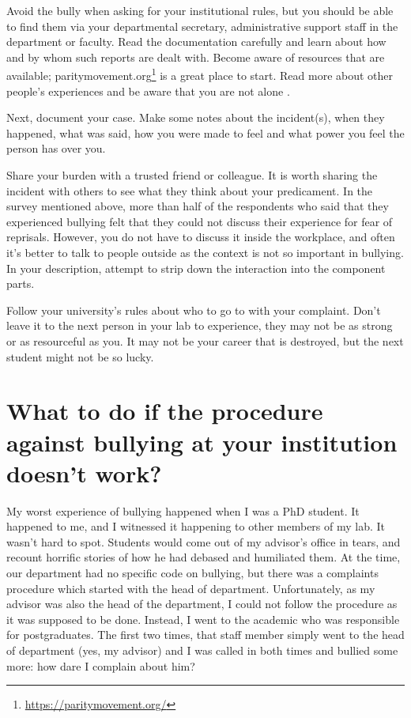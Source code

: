 \documentclass[
]{krantz}
\renewcommand{\href}[2]{#2\footnote{\url{#1}}}
\begin{document}
Avoid the bully when asking for your institutional rules, but you should be able to find them via your departmental secretary, administrative support staff in the department or faculty. Read the documentation carefully and learn about how and by whom such reports are dealt with. Become aware of resources that are available; \href{https://paritymovement.org/}{paritymovement.org} is a great place to start. Read more about other people's experiences and be aware that you are not alone \citep[\citet{malaga2004meyer}]{mahmoudi2020survivor}.

Next, document your case. Make some notes about the incident(s), when they happened, what was said, how you were made to feel and what power you feel the person has over you.

Share your burden with a trusted friend or colleague. It is worth sharing the incident with others to see what they think about your predicament. In the survey mentioned above, more than half of the respondents who said that they experienced bullying felt that they could not discuss their experience for fear of reprisals. However, you do not have to discuss it inside the workplace, and often it's better to talk to people outside as the context is not so important in bullying. In your description, attempt to strip down the interaction into the component parts.

Follow your university's rules about who to go to with your complaint. Don't leave it to the next person in your lab to experience, they may not be as strong or as resourceful as you. It may not be your career that is destroyed, but the next student might not be so lucky.

\hypertarget{what-to-do-if-the-procedure-against-bullying-at-your-institution-doesnt-work}{%
\section{What to do if the procedure against bullying at your institution doesn't work?}\label{what-to-do-if-the-procedure-against-bullying-at-your-institution-doesnt-work}}

My worst experience of bullying happened when I was a PhD student. It happened to me, and I witnessed it happening to other members of my lab. It wasn't hard to spot. Students would come out of my advisor's office in tears, and recount horrific stories of how he had debased and humiliated them. At the time, our department had no specific code on bullying, but there was a complaints procedure which started with the head of department. Unfortunately, as my advisor was also the head of the department, I could not follow the procedure as it was supposed to be done. Instead, I went to the academic who was responsible for postgraduates. The first two times, that staff member simply went to the head of department (yes, my advisor) and I was called in both times and bullied some more: how dare I complain about him?
\end{document}
